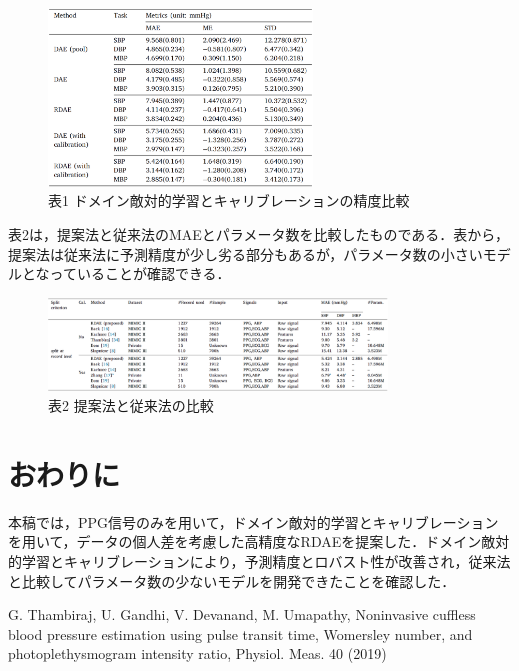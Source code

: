 \documentclass[twocolumn, a4paper]{ieicejsp}
\begin{document}
{\begin{figure}[H]
  \begin{center}
    \caption*{{\small 表1 ドメイン敵対的学習とキャリブレーションの精度比較}}
    \includegraphics[width=7cm]{./result_ablation.png}
  \end{center}
\end{figure}

表2は，提案法と従来法のMAEとパラメータ数を比較したものである．表から，提案法は従来法に予測精度が少し劣る部分もあるが，パラメータ数の小さいモデルとなっていることが確認できる．

\begin{figure}[H]
  \begin{center}
    \caption*{\small 表2 提案法と従来法の比較}
    \includegraphics[width=9cm]{./result_other_systems.png}
  \end{center}
\end{figure}


\vspace{-0.2cm}
\section{おわりに}
本稿では，PPG信号のみを用いて，ドメイン敵対的学習とキャリブレーションを用いて，データの個人差を考慮した高精度なRDAEを提案した．ドメイン敵対的学習とキャリブレーションにより，予測精度とロバスト性が改善され，従来法と比較してパラメータ数の少ないモデルを開発できたことを確認した．



\vspace{-0.1cm}
{\scriptsize
\begin{thebibliography}{9}

 G. Thambiraj, U. Gandhi, V. Devanand, M. Umapathy, Noninvasive cuffless
blood pressure estimation using pulse transit time, Womersley number, and
photoplethysmogram intensity ratio, Physiol. Meas. 40 (2019)


\end{thebibliography}}}
\end{document}

